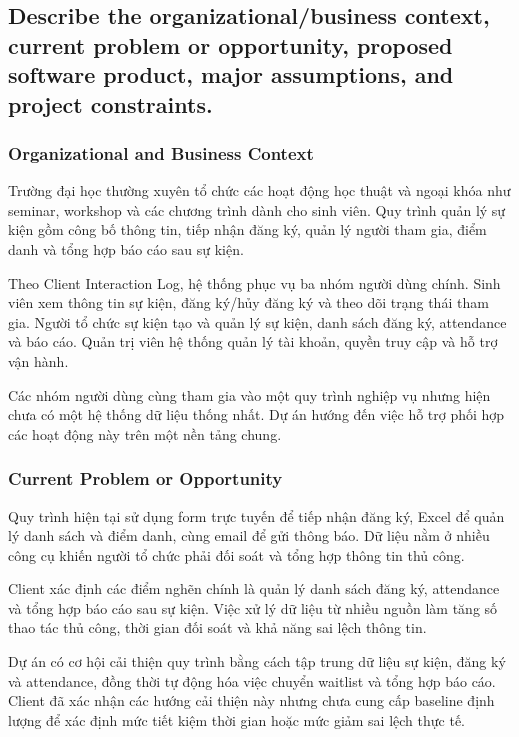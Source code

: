 \subsection{Describe the organizational/business context, current problem or opportunity, proposed software product, major assumptions, and project constraints.}

\subsubsection{Organizational and Business Context}

Trường đại học thường xuyên tổ chức các hoạt động học thuật và ngoại khóa như seminar, workshop và các chương trình dành cho sinh viên. Quy trình quản lý sự kiện gồm công bố thông tin, tiếp nhận đăng ký, quản lý người tham gia, điểm danh và tổng hợp báo cáo sau sự kiện.

Theo Client Interaction Log, hệ thống phục vụ ba nhóm người dùng chính. Sinh viên xem thông tin sự kiện, đăng ký/hủy đăng ký và theo dõi trạng thái tham gia. Người tổ chức sự kiện tạo và quản lý sự kiện, danh sách đăng ký, attendance và báo cáo. Quản trị viên hệ thống quản lý tài khoản, quyền truy cập và hỗ trợ vận hành.

Các nhóm người dùng cùng tham gia vào một quy trình nghiệp vụ nhưng hiện chưa có một hệ thống dữ liệu thống nhất. Dự án hướng đến việc hỗ trợ phối hợp các hoạt động này trên một nền tảng chung.

\subsubsection{Current Problem or Opportunity}

Quy trình hiện tại sử dụng form trực tuyến để tiếp nhận đăng ký, Excel để quản lý danh sách và điểm danh, cùng email để gửi thông báo. Dữ liệu nằm ở nhiều công cụ khiến người tổ chức phải đối soát và tổng hợp thông tin thủ công.

Client xác định các điểm nghẽn chính là quản lý danh sách đăng ký, attendance và tổng hợp báo cáo sau sự kiện. Việc xử lý dữ liệu từ nhiều nguồn làm tăng số thao tác thủ công, thời gian đối soát và khả năng sai lệch thông tin.

Dự án có cơ hội cải thiện quy trình bằng cách tập trung dữ liệu sự kiện, đăng ký và attendance, đồng thời tự động hóa việc chuyển waitlist và tổng hợp báo cáo. Client đã xác nhận các hướng cải thiện này nhưng chưa cung cấp baseline định lượng để xác định mức tiết kiệm thời gian hoặc mức giảm sai lệch thực tế.

